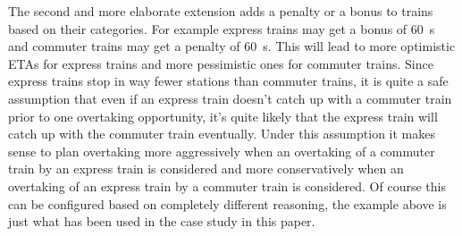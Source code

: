 \documentclass[\languages,a4paper,12pt]{article}
\begin{document}
The second and more elaborate extension adds a penalty or a bonus to trains based on their categories.
For example express trains may get a bonus of \SI{60}{\s} and commuter trains may get a penalty of \SI{60}{\s}.
This will lead to more optimistic ETAs for express trains and more pessimistic ones for commuter trains.
Since express trains stop in way fewer stations than commuter trains, it is quite a safe assumption that even if an express train doesn't catch up with a commuter train prior to one overtaking opportunity, it's quite likely that the express train will catch up with the commuter train eventually.
Under this assumption it makes sense to plan overtaking more aggressively when an overtaking of a commuter train by an express train is considered and more conservatively when an overtaking of an express train by a commuter train is considered.
Of course this can be configured based on completely different reasoning, the example above is just what has been used in the case study in this paper.
\end{document}
